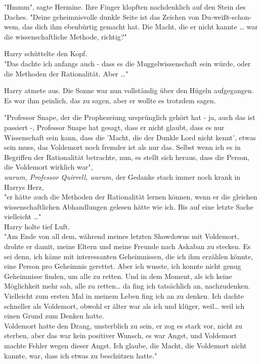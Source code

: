 {"Hmmm", sagte Hermine. Ihre Finger klopften nachdenklich auf den Stein des Daches. "Deine geheimnisvolle dunkle Seite ist das Zeichen von Du-weißt-schon-wem, das dich ihm ebenbürtig gemacht hat. Die Macht, die er nicht kannte … war die wissenschaftliche Methode, richtig?"

Harry schüttelte den Kopf.\\ "Das dachte ich anfangs auch - dass es die Muggelwissenschaft sein würde, oder die Methoden der Rationalität. Aber …"

Harry atmete aus. Die Sonne war nun vollständig über den Hügeln aufgegangen. Es war ihm peinlich, das zu sagen, aber er wollte es trotzdem sagen.

"Professor Snape, der die Prophezeiung ursprünglich gehört hat - ja, auch das ist passiert -, Professor Snape hat gesagt, dass er nicht glaubt, dass es nur Wissenschaft sein kann, dass die 'Macht, die der Dunkle Lord nicht kennt', etwas sein muss, das Voldemort noch fremder ist als nur das. Selbst wenn ich es in Begriffen der Rationalität betrachte, nun, es stellt sich heraus, dass die Person, die Voldemort wirklich war",\\ \emph{warum, Professor Quirrell, warum,} der Gedanke stach immer noch krank in Harrys Herz,\\ "er hätte auch die Methoden der Rationalität lernen können, wenn er die gleichen wissenschaftlichen Abhandlungen gelesen hätte wie ich. Bis auf eine letzte Sache vielleicht …"\\ Harry holte tief Luft.\\ "Am Ende von all dem, während meines letzten Showdowns mit Voldemort, drohte er damit, meine Eltern und meine Freunde nach Askaban zu stecken. Es sei denn, ich käme mit interessanten Geheimnissen, die ich ihm erzählen könnte, eine Person pro Geheimnis gerettet. Aber ich wusste, ich konnte nicht genug Geheimnisse finden, um alle zu retten. Und in dem Moment, als ich keine Möglichkeit mehr sah, alle zu retten… da fing ich tatsächlich an, nachzudenken. Vielleicht zum ersten Mal in meinem Leben fing ich an zu denken. Ich dachte schneller als Voldemort, obwohl er älter war als ich und klüger, weil… weil ich einen Grund zum Denken hatte.\\ Voldemort hatte den Drang, unsterblich zu sein, er zog es stark vor, nicht zu sterben, aber das war kein positiver Wunsch, es war Angst, und Voldemort machte Fehler wegen dieser Angst. Ich glaube, die Macht, die Voldemort nicht kannte, war, dass ich etwas zu beschützen hatte."

}
